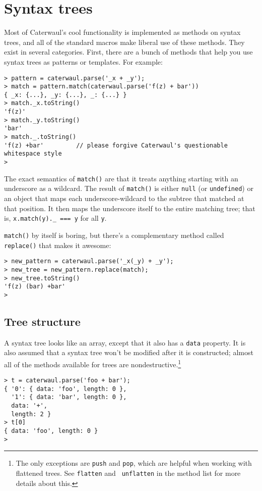 \documentclass{report}
\begin{document}
\chapter{Syntax trees}
  Most of Caterwaul's cool functionality is implemented as methods on syntax trees, and all of the standard macros make liberal use of these methods. They exist in several categories. First,
  there are a bunch of methods that help you use syntax trees as patterns or templates. For example:

\begin{verbatim}
> pattern = caterwaul.parse('_x + _y');
> match = pattern.match(caterwaul.parse('f(z) + bar'))
{ _x: {...}, _y: {...}, _: {...} }
> match._x.toString()
'f(z)'
> match._y.toString()
'bar'
> match._.toString()
'f(z) +bar'         // please forgive Caterwaul's questionable whitespace style
>
\end{verbatim}

  The exact semantics of {\tt match()} are that it treats anything starting with an underscore as a wildcard. The result of {\tt match()} is either {\tt null} (or {\tt undefined}) or an object
  that maps each underscore-wildcard to the subtree that matched at that position. It then maps the underscore itself to the entire matching tree; that is, \verb|x.match(y)._ === y| for all
  {\tt y}.

  {\tt match()} by itself is boring, but there's a complementary method called {\tt replace()} that makes it awesome:

\begin{verbatim}
> new_pattern = caterwaul.parse('_x(_y) + _y');
> new_tree = new_pattern.replace(match);
> new_tree.toString()
'f(z) (bar) +bar'
>
\end{verbatim}

\section{Tree structure}
    A syntax tree looks like an array, except that it also has a {\tt data} property. It is also assumed that a syntax tree won't be modified after it is constructed; almost all of the methods
    available for trees are nondestructive.\footnote{The only exceptions are {\tt push} and {\tt pop}, which are helpful when working with flattened trees. See {\tt flatten} and {\tt
    unflatten} in the method list for more details about this.}

\begin{verbatim}
> t = caterwaul.parse('foo + bar');
{ '0': { data: 'foo', length: 0 },
  '1': { data: 'bar', length: 0 },
  data: '+',
  length: 2 }
> t[0]
{ data: 'foo', length: 0 }
>
\end{verbatim}
\end{document}
